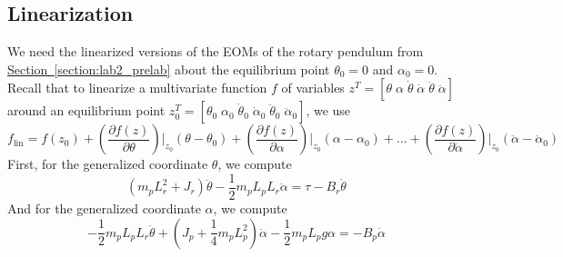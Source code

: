 \subsection{Linearization}
We need the linearized versions of the EOMs of the rotary pendulum from \hyperref[section:lab2_prelab]{Section~\ref{section:lab2_prelab}} about the equilibrium point $\theta_0 = 0$ and $\alpha_0 = 0$. Recall that to linearize a multivariate function $f$ of variables $z^T = [\theta \; \alpha \; \dot{\theta} \; \dot{\alpha} \; \ddot{\theta} \; \ddot{\alpha}]$ around an equilibrium point $z_{0}^T = [\theta_0 \; \alpha_0 \; \dot{\theta}_0 \; \dot{\alpha}_0 \; \ddot{\theta}_0 \; \ddot{\alpha}_0]$, we use
\[
    f_\text{lin} = f(z_0) + \left(\frac{\partial f(z)}{\partial \theta}\right) \bigg|_{z_0}  (\theta - \theta_0) +  \left(\frac{\partial f(z)}{\partial \alpha}\right) \bigg|_{z_0}  (\alpha - \alpha_0) + \dots +  \left(\frac{\partial f(z)}{\partial \ddot{\alpha}}\right) \bigg|_{z_0}  (\ddot{\alpha} - \ddot{\alpha}_0)
\]
First, for the generalized coordinate $\theta$, we compute
\[
    \left(m_p L_{r}^{2} + J_r\right) \ddot{\theta} - \frac{1}{2} m_p L_p L_r \ddot{\alpha} = \tau - B_r \dot{\theta}
\]
And for the generalized coordinate \( \alpha \), we compute
\[
    -\frac{1}{2} m_p L_p L_r \ddot{\theta} + \left(J_p + \frac{1}{4} m_p L_{p}^{2}\right)\ddot{\alpha} - \frac{1}{2} m_p L_{p} g \alpha = - B_p \dot{\alpha}
\]

